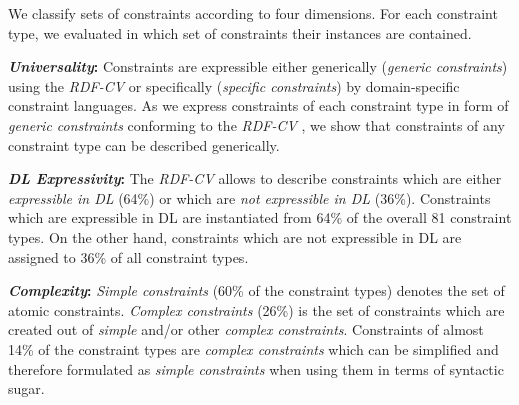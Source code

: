 \documentclass[a4paper,fontsize=11pt]{scrartcl}
\begin{document}
We classify sets of constraints according to four dimensions.
For each constraint type, we evaluated \cite{BoschNolleAcarEckert2015} in which set of constraints their instances are contained.

\textbf{\emph{Universality}:}
Constraints are expressible either generically (\emph{generic constraints}) using the \emph{RDF-CV}   
or specifically (\emph{specific constraints}) by domain-specific constraint languages. 
As we express constraints of each constraint type in form of \emph{generic constraints} conforming to the \emph{RDF-CV} \cite{BoschNolleAcarEckert2015},
we show that constraints of any constraint type can be described generically.

\textbf{\emph{DL Expressivity}:}
The \emph{RDF-CV} allows to describe 
constraints which are either \emph{expressible in DL} (64\%) or which are \emph{not expressible in DL} (36\%). Constraints which are expressible in DL are instantiated from 64\% of the overall 81 constraint types. On the other hand, constraints which are not expressible in DL are assigned to 36\% of all constraint types.

\textbf{\emph{Complexity}:}
\emph{Simple constraints} (60\% of the constraint types) denotes the set of atomic constraints. 
\emph{Complex constraints} (26\%) is the set of constraints which are created out of \emph{simple} and/or other \emph{complex constraints}.
Constraints of almost 14\% of the constraint types are \emph{complex constraints}
which can be simplified and therefore formulated as \emph{simple constraints} when using them in terms of syntactic sugar.
\end{document}
